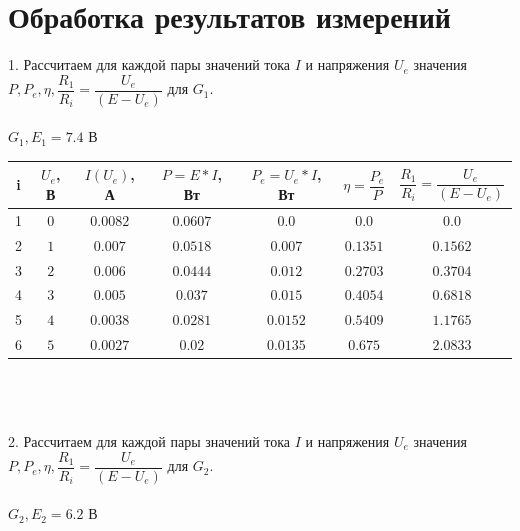 \section*{Обработка результатов измерений}

1. Рассчитаем для каждой пары значений тока $ I $ и напряжения $ U_e $
значения $ P, P_e, \eta, \dfrac{R_1}{R_i} = \dfrac{U_e}{(E - U_e)} $ для $ G_1 $.
\\
\\

$ G_1, E_1 = 7.4 $ В

\begin{tabular}{|c|c|c|c|c|c|c|}
    \hline
    i & $ U_e $, В & $ I(U_e) $, А & $ P = E*I $, Вт & $ P_e = U_e*I $, Вт & $ \eta = \dfrac{P_e}{P} $ & $ \dfrac{R_1}{R_i} = \dfrac{U_e}{(E - U_e)} $\\
    \hline
    1 & $ 0 $ & $ 0.0082 $ & $ 0.0607 $ & $ 0.0 $ & $ 0.0 $ & $ 0.0 $\\
    \hline
    2 & $ 1 $ & $ 0.007 $ & $ 0.0518 $ & $ 0.007 $ & $ 0.1351 $ & $ 0.1562 $\\
    \hline
    3 & $ 2 $ & $ 0.006 $ & $ 0.0444 $ & $ 0.012 $ & $ 0.2703 $ & $ 0.3704 $\\
    \hline
    4 & $ 3 $ & $ 0.005 $ & $ 0.037 $ & $ 0.015 $ & $ 0.4054 $ & $ 0.6818 $\\
    \hline
    5 & $ 4 $ & $ 0.0038 $ & $ 0.0281 $ & $ 0.0152 $ & $ 0.5409 $ & $ 1.1765 $\\
    \hline
    6 & $ 5 $ & $ 0.0027 $ & $ 0.02 $ & $ 0.0135 $ & $ 0.675 $ & $ 2.0833 $\\
    \hline
\end{tabular}\\
\\
\\

2. Рассчитаем для каждой пары значений тока $ I $ и напряжения $ U_e $
значения $ P, P_e, \eta, \dfrac{R_1}{R_i} = \dfrac{U_e}{(E - U_e)} $ для $ G_2 $.
\\
\\

$ G_2, E_2 = 6.2 $ В

